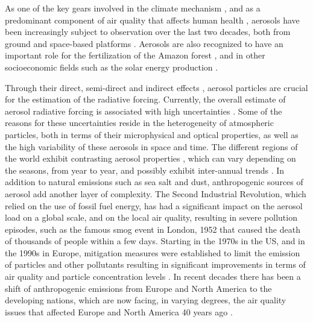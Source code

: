 \documentclass[acp, manuscript]{copernicus}
\begin{document}


\introduction  %
As one of the key gears involved in the climate mechanism \citep{poschl2005atmospheric}, and as a predominant component of air quality that affects human health \citep{burnett2014integrated}, aerosols have been increasingly subject to observation over the last two decades, both from ground and space-based platforms \citep{holben2001emerging,kaufman2002satellite}.  Aerosols are also recognized to have an important role for the fertilization of the Amazon forest \citep{yu2015fertilizing}, and in other socioeconomic fields such as the solar energy production \citep{Li11867,labordena2018blue}.

Through their direct, semi-direct and indirect effects \citep{rap2013natural,johnson2004semi,lohmann2005global}, aerosol particles are crucial for the estimation of the radiative forcing. Currently, the overall estimate of aerosol radiative forcing is associated with high uncertainties \citep{haywood2000estimates, stocker2014climate}. Some of the reasons for these uncertainties reside in the heterogeneity of atmospheric particles, both in terms of their microphysical and optical properties, as well as the high variability of these aerosols in space and time. The different regions of the world exhibit contrasting aerosol properties \citep{holben2001emerging}, which can vary depending on the seasons, from year to year, and possibly exhibit inter-annual trends \citep{streets2009anthropogenic}. In addition to natural emissions such as sea salt and dust, anthropogenic sources of aerosol add another layer of complexity. The Second Industrial Revolution, which relied on the use of fossil fuel energy, has had a significant impact on the aerosol load on a global scale, and on the local air quality, resulting in severe pollution episodes, such as the famous smog event in London, 1952 \citep{bell2004retrospective} that caused the death of thousands of people within a few days.
Starting in the 1970s in the US, and in the 1990s in Europe, mitigation measures were established to limit the emission of particles and other pollutants \citep{bryner1995blue,turnock2016impact} resulting in significant improvements in terms of air quality and particle concentration levels \citep{likens2001long}. In recent decades there has been a shift of anthropogenic emissions from Europe and North America to the developing nations, which are now facing, in varying degrees, the air quality issues that affected Europe and North America 40 years ago \citep{streets2008aerosol,ramachandran2012aerosol}.
\end{document}
